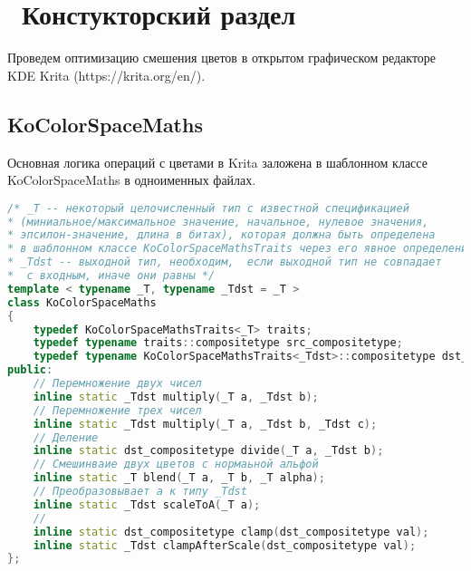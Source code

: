 \chapter{ Констукторский раздел}
\label{cha:design}

Проведем оптимизацию смешения цветов в открытом графическом редакторе KDE Krita (https://krita.org/en/). 

\section{KoColorSpaceMaths}
Основная логика операций с цветами в Krita заложена в шаблонном классе KoColorSpaceMaths в одноименных файлах. 

\begin{lstlisting}[language=c++]
/* _T -- некоторый целочисленный тип c известной спецификацией 
* (миниальное/максимальное значение, начальное, нулевое значения, 
* эпсилон-значение, длина в битах), которая должна быть определена 
* в шаблонном классе KoColorSpaceMathsTraits через его явное определение.  
* _Tdst -- выходной тип, необходим,  если выходной тип не совпадает
*  с входным, иначе они равны */
template < typename _T, typename _Tdst = _T >
class KoColorSpaceMaths
{
    typedef KoColorSpaceMathsTraits<_T> traits;
    typedef typename traits::compositetype src_compositetype;
    typedef typename KoColorSpaceMathsTraits<_Tdst>::compositetype dst_compositetype;
public:
	// Перемножение двух чисел
    inline static _Tdst multiply(_T a, _Tdst b);
    // Перемножение трех чисел
    inline static _Tdst multiply(_T a, _Tdst b, _Tdst c);
    // Деление
    inline static dst_compositetype divide(_T a, _Tdst b);
    // Смешинваие двух цветов с нормаьной альфой
    inline static _T blend(_T a, _T b, _T alpha);
    // Преобразовывает а к типу _Tdst
    inline static _Tdst scaleToA(_T a);
    // 
    inline static dst_compositetype clamp(dst_compositetype val);
    inline static _Tdst clampAfterScale(dst_compositetype val);
};
\end{lstlisting}


